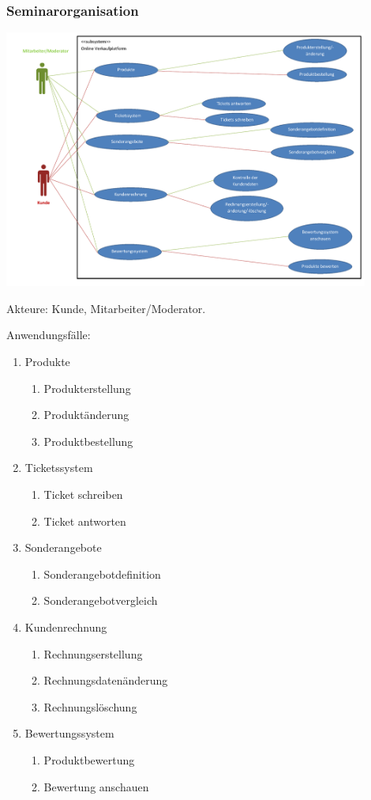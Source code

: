 \documentclass[parskip=full]{scrartcl}
\begin{document}
\subsubsection{Seminarorganisation}
\begin{center}
\includegraphics[width=0.9\textwidth]{szenario_onlineverkaufplatform.pdf}
\end{center}

Akteure: Kunde, Mitarbeiter/Moderator.

Anwendungsfälle: 
\begin{enumerate}
	\item Produkte
	\begin{enumerate}
		\item Produkterstellung
		\item Produktänderung
		\item Produktbestellung
	\end{enumerate}
\item Ticketssystem
	\begin{enumerate}
		\item Ticket schreiben
		\item Ticket antworten
	\end{enumerate}
\item Sonderangebote
	\begin{enumerate}
		\item Sonderangebotdefinition
		\item Sonderangebotvergleich
	\end{enumerate}
\item Kundenrechnung
	\begin{enumerate}
		\item Rechnungserstellung
		\item Rechnungsdatenänderung
		\item Rechnungslöschung
	\end{enumerate}
\item Bewertungssystem
	\begin{enumerate}
		\item Produktbewertung
		\item Bewertung anschauen
	\end{enumerate}
\end{enumerate}
\end{document}
